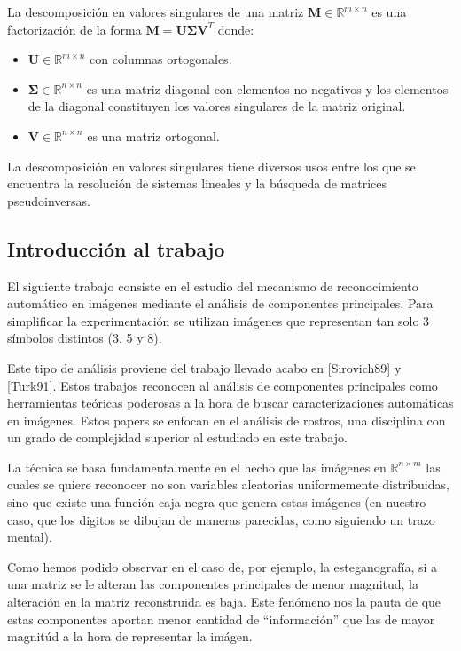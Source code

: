 La descomposici\'on en valores singulares de una matriz $\mathbf{M} \in \mathbb{R}^{m \times n}$ es una factorizaci\'on de la forma $\mathbf{M} =
\mathbf{U} \boldsymbol{\Sigma} \mathbf{V}^T$ donde:

\begin{itemize}
  \item $\mathbf{U} \in \mathbb{R}^{m \times n}$ con columnas ortogonales.
  \item $\boldsymbol{\Sigma} \in \mathbb{R}^{n \times n}$ es una matriz diagonal con elementos no negativos y los elementos de la
diagonal constituyen los valores singulares de la matriz original.
  \item $\mathbf{V} \in \mathbb{R}^{n \times n}$ es una matriz ortogonal.
\end{itemize}

La descomposici\'on en valores singulares tiene diversos usos entre los que se encuentra la resoluci\'on de
sistemas lineales y la b\'usqueda de matrices pseudoinversas.

\subsection{Introducci\'on al trabajo}

El siguiente trabajo consiste en el estudio del mecanismo de reconocimiento autom\'atico
en im\'agenes mediante el an\'alisis de componentes principales. Para simplificar la
experimentaci\'on se utilizan im\'agenes que representan tan solo 3 s\'imbolos distintos
(3, 5 y 8).

Este tipo de an\'alisis proviene del trabajo llevado acabo en [Sirovich89] y [Turk91]. Estos
trabajos reconocen al an\'alisis de componentes principales como herramientas te\'oricas poderosas
a la hora de buscar caracterizaciones autom\'aticas en im\'agenes. Estos papers se enfocan en el
an\'alisis de rostros, una disciplina con un grado de complejidad superior al estudiado en este
trabajo.

La t\'ecnica se basa fundamentalmente en el hecho que las im\'agenes en $\mathbb{R}^{n \times m}$ las cuales se
quiere reconocer no son variables aleatorias uniformemente distribuidas, sino que existe una funci\'on caja
negra que genera estas im\'agenes (en nuestro caso, que los digitos se dibujan de maneras parecidas,
como siguiendo un trazo mental).

Como hemos podido observar en el caso de, por ejemplo, la esteganograf\'ia, si a una matriz se le alteran
las componentes principales de menor magnitud, la alteraci\'on en la matriz reconstruida es baja.
Este fen\'omeno nos la pauta de que estas componentes aportan menor cantidad de ``informaci\'on''
que las de mayor magnit\'ud a la hora de representar la im\'agen.


